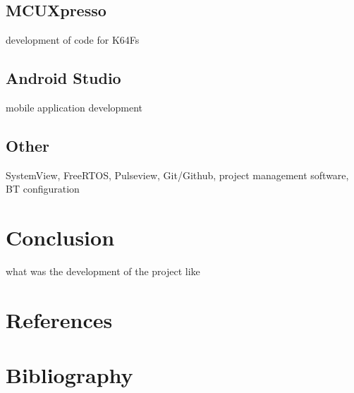 \documentclass[12pt,a4paper]{article}
\begin{document}
		\subsection{MCUXpresso}
		development of code for K64Fs
		\newpage
	
		\subsection{Android Studio}
		mobile application development
		\newpage
		
		\subsection{Other}
		SystemView, FreeRTOS, Pulseview, Git/Github, project management software, BT configuration
		\newpage
	
	\section{Conclusion}
	what was the development of the project like
	\newpage
	
	\section{References}
	\newpage
	
	\section{Bibliography}
	\newpage
	
\end{document}
